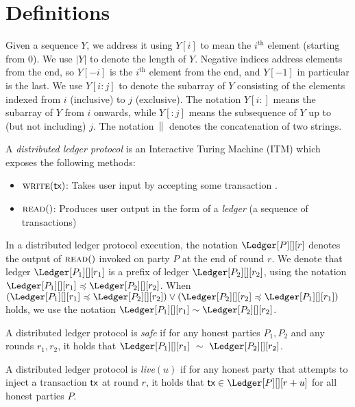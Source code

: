 \section{Definitions}

Given a sequence $Y$, we address it using $Y[i]$ to mean the $i^\text{th}$ element (starting from $0$).
We use $|Y|$ to denote the length of $Y$.
Negative indices address elements from the end, so $Y[-i]$ is the $i^\text{th}$ element from
the end, and $Y[-1]$ in particular is the last. We use $Y[i{:}j]$ to denote the subarray of $Y$
consisting of the elements indexed from $i$ (inclusive) to $j$ (exclusive). The notation $Y[i{:}]$ means the
subarray of $Y$ from $i$ onwards, while $Y[{:}j]$ means the subsequence of $Y$ up to (but not including) $j$.
The notation $\,\|\,$ denotes the concatenation of two strings.

\begin{definition}
  A \emph{distributed ledger protocol} is an Interactive Turing Machine (ITM)
  which exposes the following methods:

  \begin{itemize}
    \item $\textsc{write}(\textsf{tx})$:
      Takes user input by accepting some transaction \tx.
    \item $\textsc{read}()$:
      Produces user output in the form of a \emph{ledger} (a sequence of transactions)
  \end{itemize}
\end{definition}

In a distributed ledger protocol execution, the notation
$\Ledger[P][][r]$ denotes the output of $\textsc{read}()$
invoked on party $P$ at the end of round $r$. 
We denote that ledger
$\Ledger[P_1][][r_1]$ is a prefix of ledger $\Ledger[P_2][][r_2]$,
using the notation
$\Ledger[P_1][][r_1] \preccurlyeq \Ledger[P_2][][r_2]$. When
$(\Ledger[P_1][][r_1] \preccurlyeq \Ledger[P_2][][r_2]) \lor (\Ledger[P_2][][r_2] \preccurlyeq \Ledger[P_1][][r_1])$ holds,
we use the notation $\Ledger[P_1][][r_1] \sim \Ledger[P_2][][r_2]$.

\begin{definition}[Safety]
  A distributed ledger protocol is \emph{safe} if
  for any honest parties $P_1, P_2$ and any rounds $r_1, r_2$, it holds that
  $\Ledger[P_1][][r_1]~\sim~\Ledger[P_2][][r_2]$.
\end{definition}

\begin{definition}[Liveness]
  A distributed ledger protocol is \emph{live}$(u)$ if
  for any honest party that attempts to inject a transaction $\textsf{tx}$
  at round $r$, it holds that $\tx \in \Ledger[P][][r+u]$
  for all honest parties $P$.
\end{definition}


